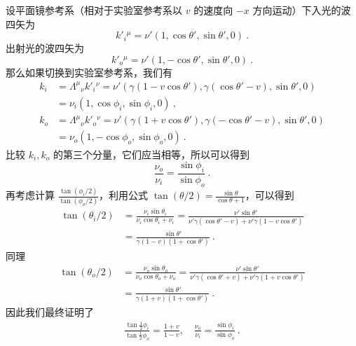 设平面镜参考系（相对于实验室参考系以 $v$ 的速度向 $-x$ 方向运动）下入光的波四矢为
\begin{equation}
k'_i{}^\mu=\nu'(1,\cos\theta',\sin\theta',0)~.
\end{equation}
出射光的波四矢为
\begin{equation}
k'_o{}^\mu=\nu'(1,-\cos\theta',\sin\theta',0)~.
\end{equation}
那么如果切换到实验室参考系，我们有
\begin{equation}
\begin{aligned}
k_i&=\Lambda^\mu{}_\nu k'_i{}^\nu=\nu'(\gamma(1-v\cos\theta'),\gamma(\cos\theta'-v),\sin\theta',0)\\
&=\nu_i(1,\cos\phi_i,\sin\phi_i,0)~,\\
k_o&=\Lambda^\mu{}_\nu k'_o{}^\nu=\nu'(\gamma(1+v\cos\theta'),\gamma(-\cos\theta'-v),\sin\theta',0)\\
&=\nu_o(1,-\cos\phi_o,\sin\phi_o,0)~.
\end{aligned}
\end{equation}
比较 $k_i,k_o$ 的第三个分量，它们应当相等，所以可以得到
\begin{equation}
\frac{\nu_o}{\nu_i}=\frac{\sin\phi_i}{\sin\phi_o}~.
\end{equation}
再考虑计算 $\frac{\tan(\phi_i/2)}{\tan(\phi_o/2)}$，利用公式 $\tan(\theta/2)=\frac{\sin\theta}{\cos\theta+1}$，可以得到
\begin{equation}
\begin{aligned}
\tan(\theta_i/2)&=\frac{\nu_i\sin\theta_i}{\nu_i\cos\theta_i+\nu_i}=\frac{\nu'\sin\theta'}{\nu'\gamma(\cos\theta'-v)+\nu'\gamma(1-v\cos\theta')}\\
&=\frac{\sin\theta'}{\gamma(1-v)(1+\cos\theta')}~.
\end{aligned}
\end{equation}
同理
\begin{equation}
\begin{aligned}
\tan(\theta_o/2)&=\frac{\nu_o\sin\theta_o}{\nu_o\cos\theta_o+\nu_o}=\frac{\nu'\sin\theta'}{\nu'\gamma(\cos\theta'+v)+\nu'\gamma(1+v\cos\theta')}\\
&=\frac{\sin\theta'}{\gamma(1+v)(1+\cos\theta')}~.
\end{aligned}
\end{equation}
因此我们最终证明了
\begin{equation}
\begin{aligned}
	\frac{\tan\frac{1}{2}\phi_i}{\tan\frac{1}{2}\phi_o}=\frac{1+v}{1-v},\quad \frac{\nu_o}{\nu_i}=\frac{\sin\phi_i}{\sin\phi_o}~.
\end{aligned}
\end{equation}
